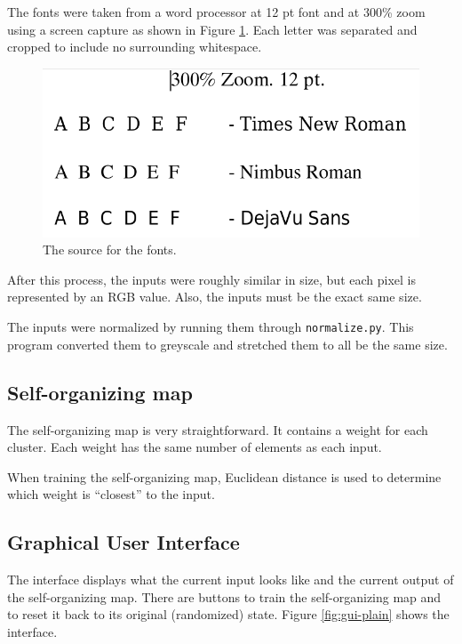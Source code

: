 \documentclass[12pt,letterpaper,oneside]{report}
\newcommand \code[1]{\texttt{#1}}
\newcommand \qq[1]{``{#1}''}
\begin{document}
The fonts were taken from a word processor at 12 pt font and at 300\% zoom using a screen capture as shown in Figure \ref{fig:font-screengrab}. Each letter was separated and cropped to include no surrounding whitespace.

\begin{figure}[ht]
  \centering
  \includegraphics[width=5in]{diagrams/font-screengrab.png}
  \caption{The source for the fonts.}
  \label{fig:font-screengrab}
\end{figure}

After this process, the inputs were roughly similar in size, but each pixel is represented by an RGB value. Also, the inputs must be the exact same size.

The inputs were normalized by running them through \code{normalize.py}. This program converted them to greyscale and stretched them to all be the same size.


\subsection{Self-organizing map}
The self-organizing map is very straightforward. It contains a weight for each cluster. Each weight has the same number of elements as each input.

When training the self-organizing map, Euclidean distance is used to determine which weight is \qq{closest} to the input.


\subsection{Graphical User Interface}
The interface displays what the current input looks like and the current output of the self-organizing map. There are buttons to train the self-organizing map and to reset it back to its original (randomized) state. Figure \ref{fig:gui-plain} shows the interface.
\end{document}
